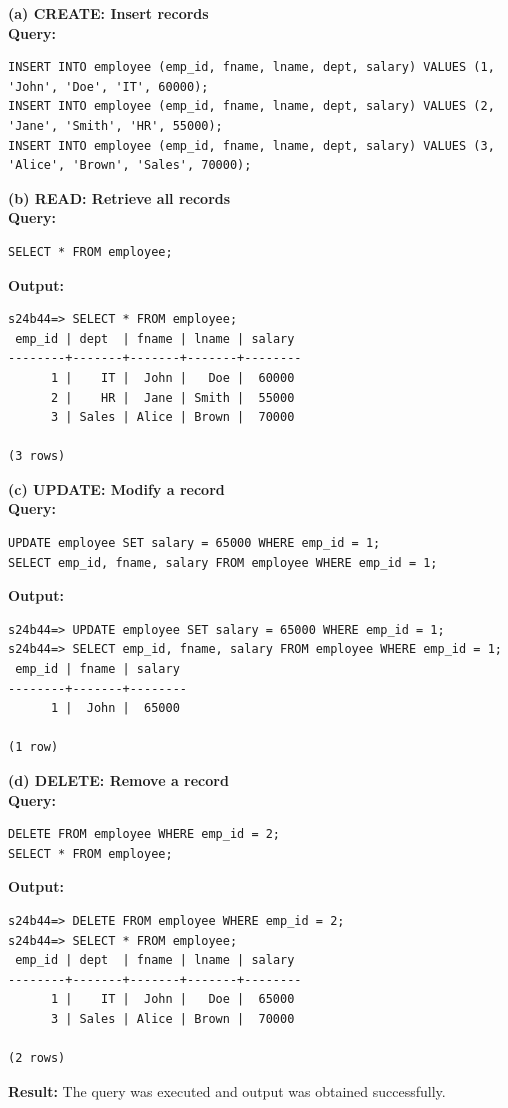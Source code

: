 \documentclass[12pt, a4paper]{article}
\begin{document}
\textbf{(a) CREATE: Insert records}\\
\textbf{Query:}
\begin{lstlisting}
INSERT INTO employee (emp_id, fname, lname, dept, salary) VALUES (1, 'John', 'Doe', 'IT', 60000);
INSERT INTO employee (emp_id, fname, lname, dept, salary) VALUES (2, 'Jane', 'Smith', 'HR', 55000);
INSERT INTO employee (emp_id, fname, lname, dept, salary) VALUES (3, 'Alice', 'Brown', 'Sales', 70000);
\end{lstlisting}

\textbf{(b) READ: Retrieve all records}\\
\textbf{Query:}
\begin{lstlisting}
SELECT * FROM employee;
\end{lstlisting}
\textbf{Output:}
\begin{lstlisting}[style=terminal]
s24b44=> SELECT * FROM employee;
 emp_id | dept  | fname | lname | salary
--------+-------+-------+-------+--------
      1 |    IT |  John |   Doe |  60000
      2 |    HR |  Jane | Smith |  55000
      3 | Sales | Alice | Brown |  70000

(3 rows)
\end{lstlisting}

\textbf{(c) UPDATE: Modify a record}\\
\textbf{Query:}
\begin{lstlisting}
UPDATE employee SET salary = 65000 WHERE emp_id = 1;
SELECT emp_id, fname, salary FROM employee WHERE emp_id = 1;
\end{lstlisting}
\textbf{Output:}
\begin{lstlisting}[style=terminal]
s24b44=> UPDATE employee SET salary = 65000 WHERE emp_id = 1;
s24b44=> SELECT emp_id, fname, salary FROM employee WHERE emp_id = 1;
 emp_id | fname | salary
--------+-------+--------
      1 |  John |  65000

(1 row)
\end{lstlisting}

\textbf{(d) DELETE: Remove a record}\\
\textbf{Query:}
\begin{lstlisting}
DELETE FROM employee WHERE emp_id = 2;
SELECT * FROM employee;
\end{lstlisting}
\textbf{Output:}
\begin{lstlisting}[style=terminal]
s24b44=> DELETE FROM employee WHERE emp_id = 2;
s24b44=> SELECT * FROM employee;
 emp_id | dept  | fname | lname | salary
--------+-------+-------+-------+--------
      1 |    IT |  John |   Doe |  65000
      3 | Sales | Alice | Brown |  70000

(2 rows)
\end{lstlisting}
\textbf{Result:} The query was executed and output was obtained successfully.
\end{document}
